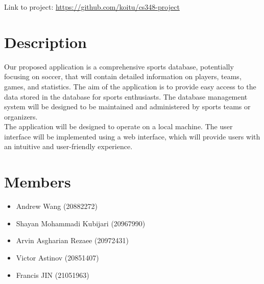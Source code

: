 \documentclass[11pt]{article}
\begin{document}
Link to project: \url{https://github.com/koitu/cs348-project}

\section{Description}
Our proposed application is a comprehensive sports database, potentially focusing on soccer, that will contain detailed information on players, teams, games, and statistics. The aim of the application is to provide easy access to the data stored in the database for sports enthusiasts. The database management system will be designed to be maintained and administered by sports teams or organizers.\\

The application will be designed to operate on a local machine. The user interface will be implemented using a web interface, which will provide users with an intuitive and user-friendly experience.

\section{Members}
\begin{itemize}
    \item Andrew Wang (20882272)
    \item Shayan Mohammadi Kubijari (20967990)
    \item Arvin Asgharian Rezaee (20972431)
    \item Victor Astinov (20851407)
    \item Francis JIN (21051963)
\end{itemize}
\end{document}
